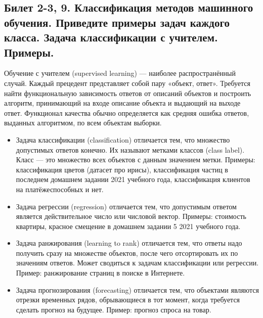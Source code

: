 \documentclass[a4paper, 12pt]{article}
\begin{document}
	\subsection*{Билет 2-3, 9. Классификация методов машинного обучения. Приведите примеры задач каждого класса. Задача классификации с учителем. Примеры.}
	Обучение с учителем (supervised learning) — наиболее распространённый случай. Каждый прецедент представляет собой пару «объект, ответ». Требуется найти функциональную зависимость ответов от описаний объектов и построить алгоритм, принимающий на входе описание объекта и выдающий на выходе ответ. Функционал качества обычно определяется как средняя ошибка ответов, выданных алгоритмом, по всем объектам выборки.
	\begin{itemize}
	\item Задача классификации (classification) отличается тем, что множество допустимых ответов конечно. Их называют метками классов (class label). Класс — это множество всех объектов с данным значением метки. Примеры: классификация цветов (датасет про ирисы), классификация частиц в последнем домашнем задании 2021 учебного года, классификация клиентов на платёжеспособных и нет.
	\item Задача регрессии (regression) отличается тем, что допустимым ответом является действительное число или числовой вектор. Примеры: стоимость квартиры, красное смещение в домашнем задании 5 2021 учебного года.
	\item Задача ранжирования (learning to rank) отличается тем, что ответы надо получить сразу на множестве объектов, после чего отсортировать их по значениям ответов. Может сводиться к задачам классификации или регрессии. Пример: ранжирование страниц в поиске в Интернете.
	\item Задача прогнозирования (forecasting) отличается тем, что объектами являются отрезки временных рядов, обрывающиеся в тот момент, когда требуется сделать прогноз на будущее. Пример: прогноз спроса на товар.
	\end{itemize}
\end{document}
